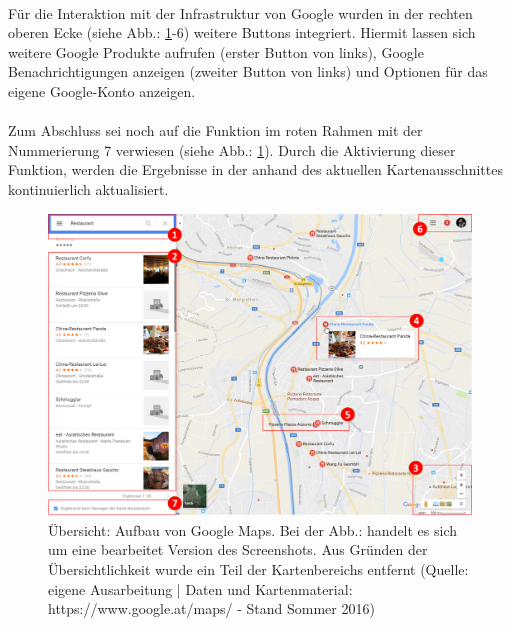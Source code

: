 \documentclass[../Bachelorarbeit.tex]{subfiles}
\begin{document}
\\
Für die Interaktion mit der Infrastruktur von Google wurden in der rechten oberen Ecke (siehe Abb.: \ref{fig:googlemapOverview}-6) weitere Buttons integriert.
Hiermit lassen sich weitere Google Produkte aufrufen (erster Button von links), Google Benachrichtigungen anzeigen (zweiter Button von links) und Optionen für das eigene Google-Konto anzeigen.\\
\\
Zum Abschluss sei noch auf die Funktion im roten Rahmen mit der Nummerierung 7 verwiesen (siehe Abb.: \ref{fig:googlemapOverview}). 
Durch die Aktivierung dieser Funktion, werden die Ergebnisse in der  anhand des aktuellen Kartenausschnittes kontinuierlich aktualisiert.

\begin{figure}[H]
\centering
\includegraphics[width=1\linewidth]{img/StandDerTechnik/googlemapOverview}
\caption[Übersicht: Aufbau von Google Maps]{Übersicht: Aufbau von Google Maps. Bei der Abb.: handelt es sich um eine bearbeitet Version des Screenshots. Aus Gründen der Übersichtlichkeit wurde ein Teil der Kartenbereichs entfernt (Quelle: eigene Ausarbeitung | Daten und Kartenmaterial: https://www.google.at/maps/ - Stand Sommer 2016)}
\label{fig:googlemapOverview}
\end{figure}
\end{document}
